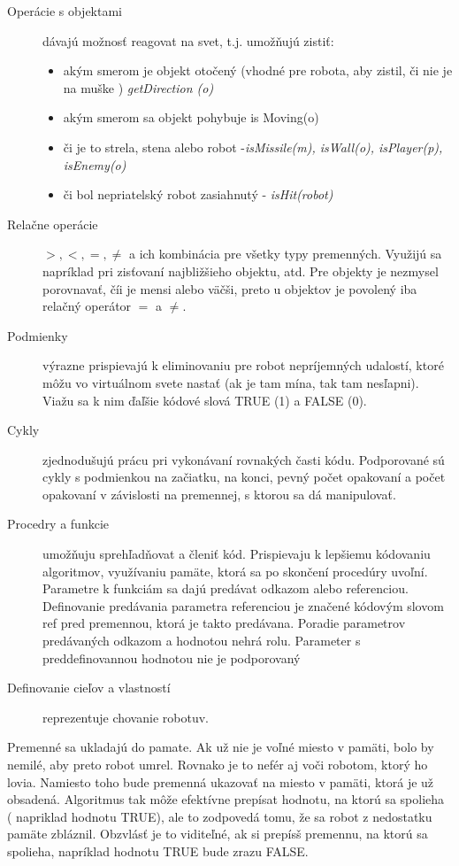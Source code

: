 \begin{description}
\item [Operácie s objektami] dávajú možnosť reagovat na  svet,  t.j. umožňujú zistiť:
\begin{itemize}
\item akým smerom je objekt otočený (vhodné pre robota, aby zistil, či nie je na muške ) {\it getDirection (o) }
\item akým smerom sa objekt pohybuje { is Moving(o)}
\item či je to strela, stena alebo robot -{\it isMissile(m), isWall(o), isPlayer(p), isEnemy(o) }
\item či bol nepriatelský robot zasiahnutý - {\it isHit(robot)}
\end{itemize}
\item[Relačne operácie] $>, <, =, \ne $ a ich kombinácia pre všetky typy premenných. Využijú sa napríklad pri zisťovaní najbližšieho objektu, atd. Pre objekty je nezmysel porovnavať, číi je mensi alebo väčši, preto u objektov je povolený iba relačný operátor $=$ a $\ne$.
\item[Podmienky] výrazne prispievajú k eliminovaniu  pre robot nepríjemných udalostí, ktoré môžu vo virtuálnom svete nastať (ak je tam mína, tak tam nesľapni). Viažu sa k nim ďaľšie kódové slová TRUE (1) a FALSE (0).
\item[Cykly] zjednodušujú prácu pri vykonávaní rovnakých časti kódu. Podporované sú cykly s podmienkou na začiatku, na konci, pevný počet opakovaní a počet opakovaní v závislosti na premennej, s ktorou sa dá manipulovať. %
\item[Procedry a funkcie] umožňuju sprehľadňovat a členiť kód. Prispievaju k lepšiemu kódovaniu algoritmov, využívaniu pamäte, ktorá sa po skončení procedúry uvoľní. Parametre k funkciám sa dajú predávat odkazom alebo referenciou.  Definovanie predávania parametra referenciou je značené kódovým slovom ref pred premennou, ktorá je takto predávana. Poradie parametrov predávaných odkazom a hodnotou nehrá rolu. Parameter s preddefinovannou hodnotou nie je podporovaný %
\item [Definovanie cieľov a vlastností] reprezentuje chovanie robotuv. %
\end{description}

Premenné sa ukladajú do pamate. Ak už nie je voľné miesto v pamäti, bolo by nemilé, aby preto robot umrel. Rovnako je to nefér aj voči robotom, ktorý ho lovia. Namiesto toho bude premenná ukazovať na miesto v pamäti, ktorá je už obsadená. 
Algoritmus tak môže efektívne prepísat hodnotu, na ktorú sa spolieha ( napriklad hodnotu TRUE), ale to zodpovedá tomu, že sa robot z nedostatku pamäte zbláznil. Obzvlásť  je to viditeľné, ak si prepísš premennu, na ktorú sa spolieha, napríklad hodnotu TRUE bude zrazu FALSE. \\

